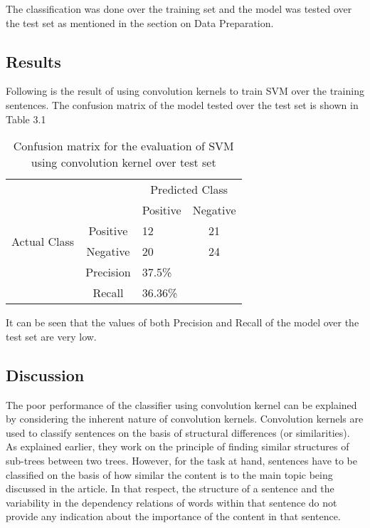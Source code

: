 The classification was done over the training set and the model was tested over the test set as mentioned in the section on Data Preparation.

\subsection{Results}
Following is the result of using convolution kernels to train SVM over the training sentences.
The confusion matrix of the model tested over the test set is shown in Table 3.1
\begin{table}[h]
\centering
\caption{Confusion matrix for the evaluation of SVM using convolution kernel over test set}
\begin{tabular}{ll|l|l}
\cline{3-4}
                                                   &                                 & \multicolumn{2}{|c|}{Predicted Class}     \\ \cline{3-4} 
                                                   &                                 & Positive & \multicolumn{1}{|c|}{Negative} \\ \hline
\multicolumn{1}{|l}{\multirow{2}{*}{Actual Class}} & \multicolumn{1}{|c|}{Positive}  & 12        & \multicolumn{1}{|c|}{21}       \\ \cline{2-4} 
\multicolumn{1}{|l}{}                              & \multicolumn{1}{|c|}{Negative}  & 20        & \multicolumn{1}{|c|}{24}       \\ \hline
                                                   & \multicolumn{1}{|c|}{Precision} & 37.5\%  &                                \\ \cline{2-3}
                                                   & \multicolumn{1}{|c|}{Recall}    & 36.36\%  &                                \\ \cline{2-3}
\end{tabular}
\end{table}

It can be seen that the values of both Precision and Recall of the model over the test set are very low.

\subsection{Discussion}
The poor performance of the classifier using convolution kernel can be explained by considering the inherent nature of convolution kernels.
Convolution kernels are used to classify sentences on the basis of structural differences (or similarities).
As explained earlier, they work on the principle of finding similar structures of sub-trees between two trees.
However, for the task at hand, sentences have to be classified on the basis of how similar the content is to the main topic being discussed in the article.
In that respect, the structure of a sentence and the variability in the dependency relations of words within that sentence do not provide any indication about the importance of the content in that sentence.

